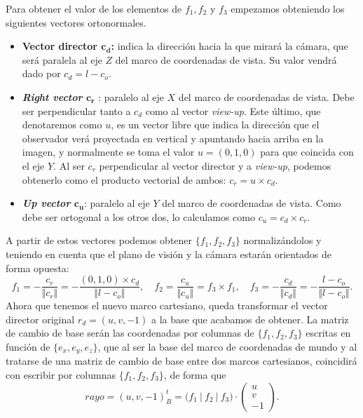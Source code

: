 Para obtener el valor de los elementos de $f_1,f_2$ y $f_3$ empezamos obteniendo los siguientes vectores ortonormales.
\begin{itemize}
    \item \textbf{Vector director $\boldsymbol{c_d}$:} indica la dirección hacia la que mirará la cámara, que será paralela al eje $Z$ del marco de coordenadas de vista. Su valor vendrá dado por $c_d = l-c_o$.
    \item \textbf{\textit{Right vector} $\boldsymbol{c_r}$ }: paralelo al eje $X$ del marco de coordenadas de vista. Debe ser perpendicular tanto a $c_d$ como al vector \textit{view-up}. Este último, que denotaremos como $u$, es un vector libre que indica la dirección que el observador verá proyectada en vertical y apuntando hacia arriba en la imagen, y normalmente se toma el valor $u=(0,1,0)$ para que coincida con el eje $Y$. Al ser $c_r$ perpendicular al vector director y a \textit{view-up}, podemos obtenerlo como el producto vectorial de ambos: $c_r = u \times c_d$.
    \item \textbf{\textit{Up vector} $\boldsymbol{c_u}$}: paralelo al eje $Y$ del marco de coordenadas de vista. Como debe ser ortogonal a los otros dos, lo calculamos como $c_u = c_d\times c_r$.
\end{itemize}
A partir de estos vectores podemos obtener $\{f_1,f_2,f_3\}$ normalizándolos y teniendo en cuenta que el plano de visión y la cámara estarán orientados de forma opuesta:
\begin{equation*}
    f_1 = -\frac{c_r}{\Vert c_r\Vert} = -\frac{(0,1,0)\times c_d}{\Vert l-c_o\Vert},\quad 
    f_2 = \frac{c_u}{\Vert c_u\Vert } = f_3\times f_1, \quad
    f_3 = -\frac{c_d}{\Vert c_d\Vert} = -\frac{l-c_o}{\Vert l-c_o\Vert}. 
\end{equation*}
Ahora que tenemos el nuevo marco cartesiano, queda transformar el vector director original $r_d = (u,v,-1)$ a la base que acabamos de obtener. La matriz de cambio de base serán las coordenadas por columnas de $\{f_1,f_2,f_3\}$ escritas en función de $\{e_x,e_y,e_z\}$, que al ser la base del marco de coordenadas de mundo y al tratarse de una matriz de cambio de base entre dos marcos cartesianos, coincidirá con escribir por columnas $\{f_1,f_2,f_3\}$, de forma que
\begin{equation*}\label{eq:rayo}
    rayo = (u,v,-1)_{B}^t = \big(f_1\ \vert\  f_2\  \vert\  f_3\big) \cdot \begin{pmatrix}
        u\\
        v\\
        -1
    \end{pmatrix}.
\end{equation*}

